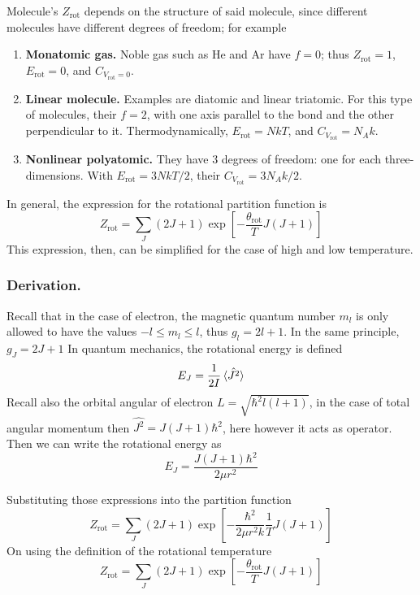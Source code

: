 \documentclass[../../../Main.tex]{subfiles}
\begin{document}
Molecule's $Z_\text{rot}$ depends on the structure of said molecule, since different molecules have different degrees of freedom; for example
\begin{enumerate}
	\item \textbf{Monatomic gas.} Noble gas such as He and Ar have $f=0$; thus $Z_\text{rot}=1$, $E_\text{rot}=0$, and $C_{V_\text{rot}=0}$.
	\item \textbf{Linear molecule.} Examples are diatomic and linear triatomic. For this type of molecules, their $f=2$, with one axis parallel to the bond and the other perpendicular to it. Thermodynamically, $E_\text{rot}=NkT$, and $C_{V_\text{rot}}=N_Ak$.
	\item \textbf{Nonlinear polyatomic.} They have 3 degrees of freedom: one for each three-dimensions. With $E_\text{rot}=3NkT/2$, their $C_{V_\text{rot}}=3N_Ak/2$.
\end{enumerate}

In general, the expression for the rotational partition function is
\begin{equation*}
	Z_\text{rot}=\sum_J(2J+1)\exp\left[-\frac{\theta_\text{rot}}{T}J(J+1)\right]
\end{equation*}
This expression, then, can be simplified for the case of high and low temperature.

\subsubsection{Derivation.} Recall that in the case of electron, the magnetic quantum number $m_l$ is only allowed to have the values $-l\leq m_l\leq l$, thus $g_l=2l+1$. In the same principle, $g_J=2J+1$ In quantum mechanics, the rotational energy is defined
\begin{equation*}
	E_J=\frac{1}{2I}\braket{\hat{J^2}}
\end{equation*}
Recall also the orbital angular of electron $L=\sqrt{\hbar^2l(l+1)}$, in the case of total angular momentum then $\hat{J^2}= J(J+1)\hbar^2$, here however it acts as operator. Then we can write the rotational energy as
\begin{equation*}
	E_J=\frac{J(J+1)\hbar^2}{2\mu r^2 }
\end{equation*}

Substituting those expressions into the partition function
\begin{equation*}
	Z_\text{rot}=\sum_J(2J+1)\exp\left[-\frac{\hbar^2}{2\mu r^2 k}\frac{1}{T}J(J+1)\right]
\end{equation*}
On using the definition of the rotational temperature
\begin{equation*}
	Z_\text{rot}=\sum_J(2J+1)\exp\left[-\frac{\theta_\text{rot}}{T}J(J+1)\right]
\end{equation*}
\end{document}
